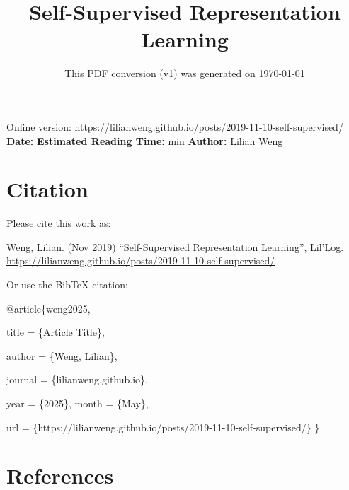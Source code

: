 \documentclass[12pt]{article}
\title{Self-Supervised Representation Learning}
\date{This PDF conversion (v1) was generated on \today\footnotemark}
\begin{document}
\maketitle
\begin{center}
    Online version: \url{https://lilianweng.github.io/posts/2019-11-10-self-supervised/} \\
    \textbf{Date:} \quad
    \textbf{Estimated Reading Time:}  min \quad
    \textbf{Author:} Lilian Weng
\end{center}




\newpage
\tableofcontents
\newpage
\vspace{1em}
\n\n\n\section{Citation}
Please cite this work as:

\begin{tcolorbox}[colback=black!5!white, colframe=black!80!white, boxrule=0.5pt, arc=2mm, left=1mm, right=1mm, top=1mm, bottom=1mm]
  Weng, Lilian. (Nov 2019) ``Self-Supervised Representation Learning'', Lil'Log. \url{https://lilianweng.github.io/posts/2019-11-10-self-supervised/}
  \end{tcolorbox}

Or use the BibTeX citation:

\begin{tcolorbox}[
    colback=black!5!white,
    colframe=black!80!white,
    boxrule=0.5pt,
    arc=2mm,
    left=1mm,
    right=1mm,
    top=1mm,
    bottom=1mm,
    listing only,
    listing options={
      basicstyle=\ttfamily\footnotesize,
      breaklines=true,
      literate={\{}{{\char`\{}}1 {\}}{{\char`\}}}1
    }
  ]
  @article\{weng2025,

    title   = \{Article Title\},

    author  = \{Weng, Lilian\},

    journal = \{lilianweng.github.io\},

    year    = \{2025\},
    month   = \{May\},

    url     = \{https://lilianweng.github.io/posts/2019-11-10-self-supervised/\}\n
  \}
  \end{tcolorbox}

\newpage
\section{References}

\n
\end{document}
